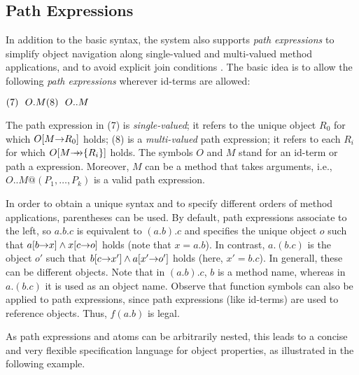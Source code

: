 \documentclass[11pt]{report}
\begin{document}
\subsection{Path Expressions}

In addition to the basic \fl syntax, the \FLORA  system also supports
\emph{path expressions} to simplify object navigation along
single-valued and multi-valued method applications, and to avoid
explicit join conditions \cite{frohn-lausen-uphoff-VLDB-94}.  The
basic idea is to allow the following \emph{path expressions} wherever
id-terms are allowed:

  \medskip

\begin{math}
  \hfill (7)~~O.M \hfill (8)~~O..M \hfill
\end{math} \medskip

\noindent
The path expression in (7) is \emph{single-valued}; it refers to the unique
object $R_0$ for which $O[M{\rightarrow} R_0]$ holds; (8) is a \emph{multi-valued}
path expression; it refers to each $R_i$ for which $O[M{\rightarrow\!\!\!\!\rightarrow}\{R_i\}]$ holds.
The symbols $O$ and $M$ stand for an id-term or path a expression.
Moreover, $M$ can be a method that takes arguments, i.e.,
$O..M@(P_1,\dots,P_k)$ is a valid path expression.
  
In order to obtain a unique syntax and to specify different orders of
method applications, parentheses can be used. By default, path expressions
associate to the left, so $a.b.c$ is equivalent to $(a.b).c$ and specifies
the unique object $o$ such that $a[b{\rightarrow} x] \land x[c{\rightarrow} o]$ holds (note
that $x=a.b$). In contrast, $a.(b.c)$ is the object $o'$ such that $b[c{\rightarrow}
x'] \land a[x'{\rightarrow} o']$ holds (here, $x'=b.c$). In generall, these can be
different objects. Note that in $(a.b).c$, $b$ is a method name, whereas in
$a.(b.c)$ it is used as an object name.  Observe that function symbols can
also be applied to path expressions, since path expressions (like id-terms)
are used to reference objects. Thus, $f(a.b)$ is legal.
  
As path expressions and \fl atoms can be arbitrarily nested, this leads
to a concise and very flexible specification language for object
properties, as illustrated in the following example.
\end{document}

